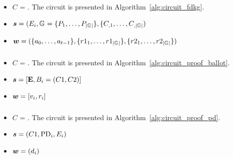 \documentclass[runningheads]{llncs}
\begin{document}
\begin{itemize}
    \item $C$ = \ProofFDKGInformal{}. The circuit is presented in Algorithm~\ref{alg:circuit_fdkg}.

    \item $\vec{s}=(\PartialEncryptionKey{i}, \GuardianSetOf{} = \{\Party{1},\dots,\Party{|\GuardianSetOf{}|}\}, \{\EncryptedPartialDecryptionKeyShare{}{1},\dots, \EncryptedPartialDecryptionKeyShare{}{|\GuardianSetOf{}|})$
    
    \item $\vec{w}=(\{a_0, \dots, a_{t-1}\}, \{r1_1,\dots,r1_{|\GuardianSetOf{}|}\}, \{r2_1,\dots,r2_{|\GuardianSetOf{}|}\})$
\end{itemize}

\subsubsection{}\label{sec:proof-ballot}

\begin{itemize}
    \item $C$ = \ProofBALLOTInformal{}. The circuit is presented in Algorithm~\ref{alg:circuit_proof_ballot}.
    
    \item $\vec{s}=[\EncryptionKey{}, \Ballot{i} = (C1, C2)]$
    
    \item $\vec{w}=[\Vote{i}, r_i]$
\end{itemize}


\subsubsection{\ProofPD{}}\label{sec:proof-pd}
\begin{itemize}
    \item $C$ = \ProofPDInformal{}. The circuit is presented in Algorithm~\ref{alg:circuit_proof_pd}.
    
    \item $\vec{s}=(\TotalA{}, \PartialDecryptionFrom{i}, \PartialEncryptionKey{i})$
    
    \item $\vec{w}=(\PartialDecryptionKey{i})$
\end{itemize}


\subsubsection{}\label{sec:proof-pds}
\end{document}
